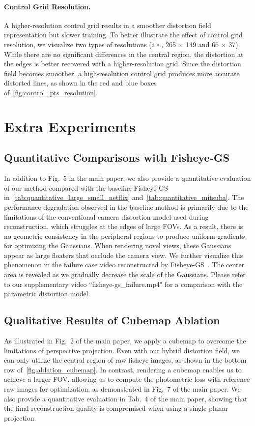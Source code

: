 

\paragraph{Control Grid Resolution.}
A higher-resolution control grid results in a smoother distortion field representation but slower training. To better illustrate the effect of control grid resolution, we visualize two types of resolutions (\textit{i.e.,} 265 $\times$ 149 and 66 $\times$ 37). While there are no significant differences in the central region, the distortion at the edges is better recovered with a higher-resolution grid. Since the distortion field becomes smoother, a high-resolution control grid produces more accurate distorted lines, as shown in the red and blue boxes of~\cref{fig:control_pts_resolution}.

\section{Extra Experiments}

\subsection{Quantitative Comparisons with Fisheye-GS}
In addition to Fig.~5 in the main paper, we also provide a quantitative evaluation of our method compared with the baseline Fisheye-GS~\cite{liao2024fisheye} in~\cref{tab:quantitative_large_small_netflix} and~\cref{tab:quantitative_mitsuba}. 
The performance degradation observed in the baseline method is primarily due to the limitations of the conventional camera distortion model used during reconstruction, which struggles at the edges of large FOVs. 
As a result, there is no geometric consistency in the peripheral regions to produce uniform gradients for optimizing the Gaussians.
When rendering novel views, these Gaussians appear as large floaters that occlude the camera view. We further visualize this phenomenon in the failure case video reconstructed by Fisheye-GS~\cite{liao2024fisheye}. The center area is revealed as we gradually decrease the scale of the Gaussians.
Please refer to our supplementary video ``fisheye-gs\_failure.mp4" for a comparison with the parametric distortion model.



\subsection{Qualitative Results of Cubemap Ablation}
As illustrated in Fig.~2 of the main paper, we apply a cubemap to overcome the limitations of perspective projection. Even with our hybrid distortion field, we can only utilize the central region of raw fisheye images, as shown in the bottom row of~\cref{fig:ablation_cubemap}. In contrast, rendering a cubemap enables us to achieve a larger FOV, allowing us to compute the photometric loss with reference raw images for optimization, as demonstrated in Fig.~7 of the main paper. We also provide a quantitative evaluation in Tab.~4 of the main paper, showing that the final reconstruction quality is compromised when using a single planar projection.

